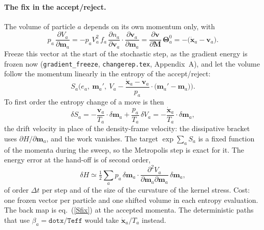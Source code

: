 \documentclass[11pt,aps,preprint,nofootinbib,superscriptaddress,tightenlines]{revtex4-2}
\def\st{\begin{equation}}
\def\stp{\end{equation}}
\def\Eq#1{eq.~(\ref{#1})}
\let\oldparagraph\paragraph
\renewcommand{\paragraph}{\par\bigskip\oldparagraph}
\begin{document}
\paragraph{The fix in the accept/reject.}  The volume of particle $a$ depends on its own momentum only, with
\st
p_a\,\frac{\partial V_a}{\partial\bm m_a}=-p_aV_a^2\,f_a\,\frac{\partial n_a}{\partial\bm v_a}\cdot\frac{\partial\bm v_a}{\partial\bm m_a}
=\frac{\partial\bm v}{\partial\bm M}\,\bm\Theta^0_a=-\big(\dot{\bm x}_a-\bm v_a\big) .
\stp
Freeze this vector at the start of the stochastic step, as the gradient energy is frozen now (\texttt{gradient\_freeze},
\texttt{changerep.tex}, Appendix~A), and let the volume follow the momentum linearly in the entropy of the accept/reject:
\st
\boxed{\;
S_a\Big(e_a,\ \bm m_a',\ V_a-\frac{\dot{\bm x}_a-\bm v_a}{p_a}\cdot\big(\bm m_a'-\bm m_a\big)\Big) .\;}
\label{Sfix}
\stp
To first order the entropy change of a move is then
\st
\delta S_a=-\frac{\bm v_a}{T_a}\cdot\delta\bm m_a+\frac{p_a}{T_a}\,\delta V_a=-\frac{\dot{\bm x}_a}{T_a}\cdot\delta\bm m_a ,
\stp
the drift velocity in place of the density-frame velocity: the dissipative bracket uses $\partial H/\partial\bm m_a$, and the work vanishes.
The target $\exp\sum_aS_a$ is a fixed function of the momenta during the sweep, so the Metropolis step is exact for it.  The energy
error at the hand-off is of second order,
\st
\delta H\simeq\tfrac12\sum_ap_a\,\delta\bm m_a\cdot\frac{\partial^2V_a}{\partial\bm m_a\partial\bm m_a}\,\delta\bm m_a ,
\stp
of order $\Delta t$ per step and of the size of the curvature of the kernel stress.  Cost: one frozen vector per particle and one shifted
volume in each entropy evaluation.  The back map is \Eq{Sfix} at the accepted momenta.  The deterministic paths that use
$\beta_a=\texttt{dotx}/\texttt{Teff}$ would take $\dot{\bm x}_a/T_a$ instead.
\end{document}
